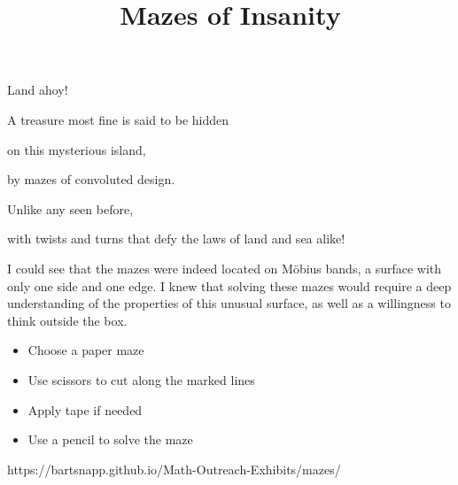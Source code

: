\documentclass{../exhibit}
\title{Mazes of Insanity}
\begin{document}
\begin{context}

Land ahoy!

A treasure most fine is said to be hidden


on this mysterious island, 


by mazes of convoluted design.



Unlike any seen before,


with twists and turns that defy the laws of land and sea alike!

I could see that the mazes were indeed located on M\"obius bands, a surface with only one side and one edge. I knew that solving these mazes would require a deep understanding of the properties of this unusual surface, as well as a willingness to think outside the box.
\end{context}

\begin{directions}
  \begin{itemize}
    \item Choose a paper maze
\item Use scissors to cut along the marked lines 
\item Apply tape if needed
  \item Use a pencil to solve the maze
\end{itemize}
\end{directions}

\begin{example}
\end{example}

\begin{mathConnections}
  https://bartsnapp.github.io/Math-Outreach-Exhibits/mazes/
\end{mathConnections}
\end{document}
